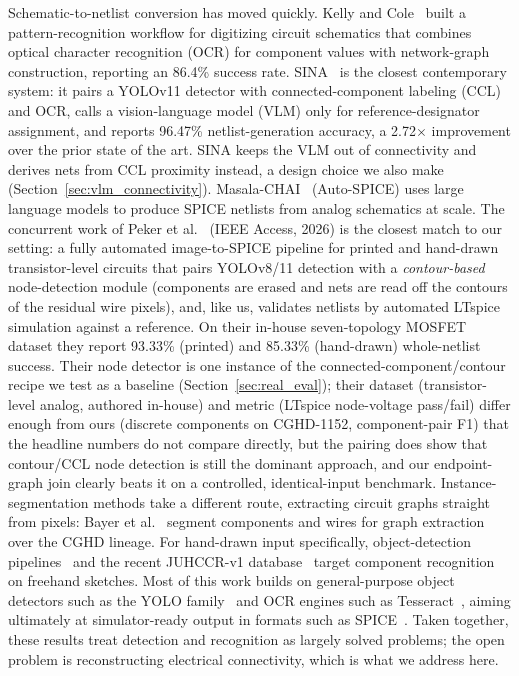 \documentclass[journal]{IEEEtran}
\begin{document}
Schematic-to-netlist conversion has moved quickly. Kelly and Cole~\cite{kelly2024digitizing} built a pattern-recognition workflow for digitizing circuit schematics that combines optical character recognition (OCR) for component values with network-graph construction, reporting an 86.4\% success rate. SINA~\cite{sina2026} is the closest contemporary system: it pairs a YOLOv11 detector with connected-component labeling (CCL) and OCR, calls a vision-language model (VLM) only for reference-designator assignment, and reports 96.47\% netlist-generation accuracy, a 2.72$\times$ improvement over the prior state of the art. SINA keeps the VLM out of connectivity and derives nets from CCL proximity instead, a design choice we also make (Section~\ref{sec:vlm_connectivity}). Masala-CHAI~\cite{masalachai2024} (Auto-SPICE) uses large language models to produce SPICE netlists from analog schematics at scale. The concurrent work of Peker et al.~\cite{peker2026} (IEEE Access, 2026) is the closest match to our setting: a fully automated image-to-SPICE pipeline for printed and hand-drawn transistor-level circuits that pairs YOLOv8/11 detection with a \emph{contour-based} node-detection module (components are erased and nets are read off the contours of the residual wire pixels), and, like us, validates netlists by automated LTspice simulation against a reference. On their in-house seven-topology MOSFET dataset they report 93.33\% (printed) and 85.33\% (hand-drawn) whole-netlist success. Their node detector is one instance of the connected-component/contour recipe we test as a baseline (Section~\ref{sec:real_eval}); their dataset (transistor-level analog, authored in-house) and metric (LTspice node-voltage pass/fail) differ enough from ours (discrete components on CGHD-1152, component-pair F1) that the headline numbers do not compare directly, but the pairing does show that contour/CCL node detection is still the dominant approach, and our endpoint-graph join clearly beats it on a controlled, identical-input benchmark. Instance-segmentation methods take a different route, extracting circuit graphs straight from pixels: Bayer et al.~\cite{instanceseg2023} segment components and wires for graph extraction over the CGHD lineage. For hand-drawn input specifically, object-detection pipelines~\cite{handdrawn2021} and the recent JUHCCR-v1 database~\cite{juhccr2025} target component recognition on freehand sketches. Most of this work builds on general-purpose object detectors such as the YOLO family~\cite{redmon2016yolo,jocher2023yolo} and OCR engines such as Tesseract~\cite{smith2007tesseract}, aiming ultimately at simulator-ready output in formats such as SPICE~\cite{nagel1973spice}. Taken together, these results treat detection and recognition as largely solved problems; the open problem is reconstructing electrical connectivity, which is what we address here.
\end{document}
